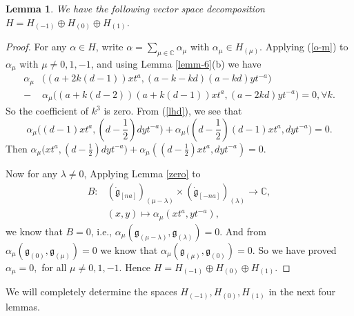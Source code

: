 \documentclass[1p]{elsarticle}
\numberwithin{equation}{section}
\def\dg{\dot{\mathfrak{g}}}
\def\fg{\mathfrak{g}}
\def\bC{\mathbb{C}}
\newtheorem{lemm}[theo]{Lemma}
\begin{document}
\begin{lemm}\label{lemm-7} We have the following vector space decomposition $H=H_{(-1)}\oplus H_{(0)}\oplus H_{(1)}$. \end{lemm}

\begin{proof} For any $\alpha\in H$, write $\alpha=\sum_{\mu \in \bC} \alpha_\mu$ with $\alpha_\mu\in H_{(\mu)}$. Applying (\ref{o-m}) to $\alpha_\mu$ with $\mu \ne 0,1,-1$, and using Lemma \ref{lemm-6}(b) we have $$\begin{aligned} \alpha_\mu&\big((a+2k(d-1))xt^a,(a-k-kd)(a-kd)yt^{-a}\big)\\ -&\alpha_\mu\big((a+k(d-2))(a+k(d-1))xt^a,(a-2kd)yt^{-a}\big)=0,  \forall k.\end{aligned}$$
So the coefficient of $k^3$ is zero. From (\ref{lhd}), we see that  $$\alpha_\mu\big((d-1)xt^a, (d-\frac 12)dyt^{-a}\big)+\alpha_\mu\big((d-\frac 12)(d-1)xt^a,dyt^{-a}\big)=0.$$
Then $\alpha_\mu\big(xt^a, (d-\frac 12)dyt^{-a}\big)+\alpha_\mu((d-\frac 12)xt^a,dyt^{-a})=0$.

Now for any $\lambda\ne 0$, Applying Lemma \ref{zero} to
$$\begin{aligned} B:&(\dg_{[na]})_{(\mu-\lambda)}\times (\dg_{[-na]})_{(\lambda)}\rightarrow \bC,\\  &(x,y)\mapsto \alpha_\mu(xt^a,yt^{-a}),\end{aligned}$$  we know that $B=0$,  i.e., $\alpha_\mu(\fg_{(\mu-\lambda)},\fg_{(\lambda)})=0$. And from $\alpha_\mu(\fg_{(0)},\fg_{(\mu)})=0$ we know that  $\alpha_\mu(\fg_{(\mu)},\fg_{(0)})=0$. So we have proved $\alpha_\mu=0,$ for all $\mu\ne 0,1,-1$. Hence $H=H_{(-1)}\oplus H_{(0)}\oplus H_{(1)}$. \end{proof}

We will completely determine  the spaces $H_{(-1)}, H_{(0)}, H_{(1)}$ in the next four lemmas.
\end{document}
